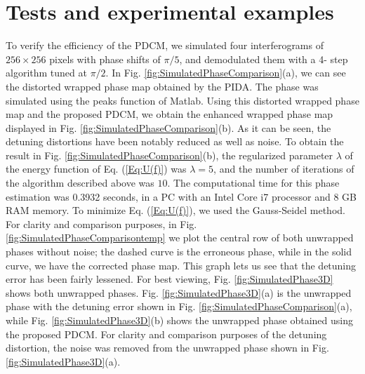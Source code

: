 \section{Tests and experimental examples}
To verify the efficiency of the PDCM, we simulated four interferograms of $256 
\times 256$ pixels with phase shifts of $\pi/5$, and demodulated them with a 4-
step algorithm tuned at $\pi/2$. In Fig. \ref{fig:SimulatedPhaseComparison}(a), 
we can see the distorted wrapped phase map obtained by the PIDA. The phase was 
simulated using the peaks function of Matlab. Using this distorted wrapped
phase map and the proposed PDCM, we obtain the enhanced wrapped phase map 
displayed in Fig. \ref{fig:SimulatedPhaseComparison}(b). As it can be seen, the 
detuning distortions have been notably reduced as well as noise. To obtain the
result in Fig. \ref{fig:SimulatedPhaseComparison}(b), the regularized parameter
$\lambda$ of the energy function of Eq. (\ref{Eq:U(f)}) was $\lambda=5$, and the
number of iterations of the algorithm described above was $10$. The
computational time for this phase estimation was 0.3932 seconds, in a PC with
an Intel Core i7 processor and 8 GB RAM memory. To minimize Eq. (\ref{Eq:U(f)}),
we used the Gauss-Seidel method. For clarity and comparison purposes, in Fig. 
\ref{fig:SimulatedPhaseComparisontemp} we plot the central row of both 
unwrapped phases without noise; the dashed curve is the erroneous phase, while
in the solid curve, we have the corrected phase map. This graph lets us see that
the detuning error has been fairly lessened. For best viewing, Fig. 
\ref{fig:SimulatedPhase3D} shows both unwrapped phases. Fig. 
\ref{fig:SimulatedPhase3D}(a) is the unwrapped phase with the detuning error 
shown in Fig. \ref{fig:SimulatedPhaseComparison}(a), while Fig. 
\ref{fig:SimulatedPhase3D}(b) shows the unwrapped phase obtained using the 
proposed PDCM.  For clarity and comparison purposes of the detuning 
distortion, the noise was removed from the unwrapped phase shown in Fig.
\ref{fig:SimulatedPhase3D}(a).
